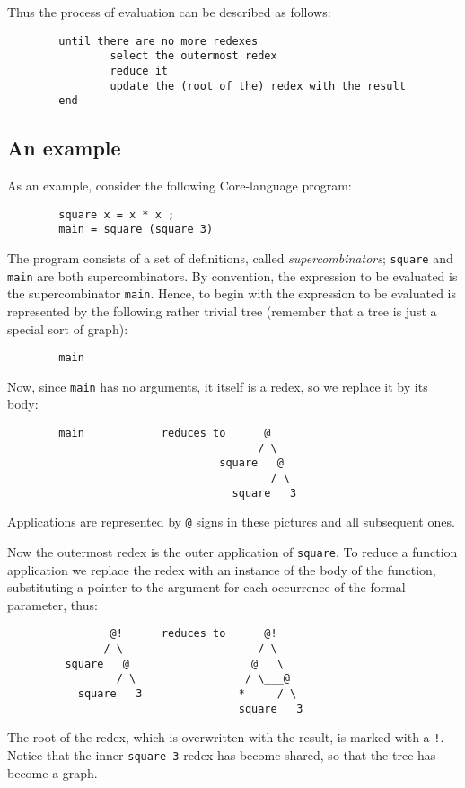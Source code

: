 \begin{together}
Thus the process of evaluation can be described as follows:
\begin{verbatim}
        until there are no more redexes
                select the outermost redex
                reduce it
                update the (root of the) redex with the result
        end
\end{verbatim}
\end{together}

\subsection{An example}

As an example, consider the following Core-language program:
\begin{verbatim}
        square x = x * x ;
        main = square (square 3)
\end{verbatim}
The program consists of a set of definitions, called {\em supercombinators\/};
\mbox{\tt square} and \mbox{\tt main} are both supercombinators.
By convention, the expression to be evaluated is the supercombinator \mbox{\tt main}.
Hence, to begin with the expression to be evaluated is represented by the
following rather trivial tree
(remember that a tree is just a special sort of graph):
\begin{verbatim}
        main
\end{verbatim}
Now, since \mbox{\tt main} has no arguments, it itself is a redex, so we replace it
by its body:
\begin{verbatim}
        main            reduces to      @
                                       / \
                                 square   @
                                         / \
                                   square   3
\end{verbatim}
Applications are represented by {\tt @} signs in these pictures and all
subsequent ones.

Now the outermost redex is the outer application of \mbox{\tt square}.
To reduce a function application we replace the redex with
an instance of the body of the function, substituting a pointer to the
argument for each occurrence of the formal parameter, thus:
\begin{verbatim}
                @!      reduces to      @!
               / \                     / \
         square   @                   @   \
                 / \                 / \___@
           square   3               *     / \
                                    square   3
\end{verbatim}
The root of the redex, which is overwritten with the result, is marked with
a \mbox{\tt !}.
Notice that the inner \mbox{\tt square\ 3} redex has become shared, so that
the tree has become a graph.

